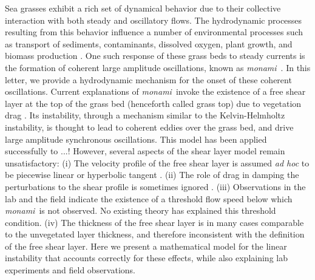 \documentclass[aps,prl,twocolumn,superscriptaddress,10pt]{revtex4-1}  %
\newcommand{\monami}{\textit{monami}}
\begin{document}
\maketitle
Sea grasses exhibit a rich set of dynamical behavior due to their collective interaction with both steady and oscillatory flows.  
The hydrodynamic processes resulting from this behavior influence a number of environmental processes such as transport of sediments, contaminants, dissolved oxygen, plant growth, and biomass production  \cite{Fonseca87,Grizzle96,Nepf99,Nepf2012}. 
One such response of these grass beds to steady currents is the formation of coherent large amplitude oscillations, known as \monami ~\cite{AckermanOkubo93}.  
In this letter, we provide a hydrodynamic mechanism for the onset of these coherent oscillations.
\newline
Current explanations of \monami ~invoke the existence of a free shear layer at the top of the grass bed (henceforth called grass top) due to vegetation drag  \cite{Ghisal02,Raupach96}. 
Its instability, through a mechanism similar to the Kelvin-Helmholtz instability, is thought to lead to coherent eddies over the grass bed, and drive large amplitude synchronous oscillations.
This model has been applied successfully to ...!
\newline
However, several aspects of the shear layer model remain unsatisfactory: 
(i)   The velocity profile of the free shear layer is assumed \textit{ad hoc} to be piecewise linear \cite{Delangre06} or hyperbolic tangent \cite{Ghisal02,Raupach96}. 
(ii)  The role of drag in damping the perturbations to the shear profile is sometimes ignored \cite{Raupach96}. 
(iii) Observations in the lab \cite{Ghisal02} and the field \cite{Grizzle96} indicate the existence of a threshold flow speed below which \monami ~is not observed. No existing theory has explained this threshold condition. 
(iv)  The thickness of the free shear layer is in many cases comparable to the unvegetated layer thickness, and therefore inconsistent with the definition of the free shear layer.
Here we present a mathematical model for the linear instability that accounts correctly for these effects, while also explaining lab experiments and field observations.
\end{document}
